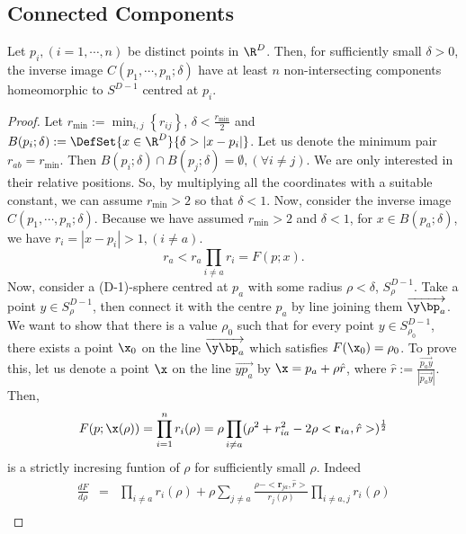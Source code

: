 \documentclass{article}
\begin{document}
\subsection{Connected Components}
\label{sec:org0113ac2}
\begin{prop}
Let $p_i, (i=1,\cdots,n)$ be distinct points in $\R^D$. Then, for sufficiently small $\delta >0$, the inverse image $C(p_1,\cdots,p_n;\delta)$ have at least $n$ non-intersecting components homeomorphic to $S^{D-1}$ centred at $p_i$.
\end{prop}
\begin{proof}
Let $r_{\min}:= \min_{i,j}\left\{r_{ij}\right\}$, $\delta < \frac{r_{\min}}{2}$ and $B(p_i;\delta):= \DefSet{x\in \R^D}{\delta >|x-p_i|}$. Let us denote the minimum pair $r_{ab}=r_{\min}$. Then $B(p_i;\delta)\cap B(p_j;\delta) = \emptyset, (\forall i\ne j)$.  We are only interested in their relative positions. So, by multiplying all the coordinates with a suitable constant, we can assume $r_{\min}>2$ so that $\delta <1$. Now, consider the inverse image $C(p_1,\cdots,p_n;\delta)$. Because we have assumed $r_{\min}>2$ and $\delta <1$, for $x\in B(p_a;\delta)$, we have $r_i = |x-p_i|>1, (i\ne a)$. 
\begin{equation}
\label{eq:inequality_radius}
r_a < r_a\prod_{i\ne a}r_i =F(p;x).
\end{equation}
Now, consider a (D-1)-sphere centred at $p_a$ with some radius $\rho < \delta$, $S^{D-1}_{\rho}$. Take a point $y \in S^{D-1}_{\rho}$, then connect it with the centre $p_a$ by line joining them $\overrightarrow{\y \bp_a}$. We want to show that there is a value $\rho_0$ such that for every point $y \in S^{D-1}_{\rho_0}$, there exists a point $\x_0$ on the line $\overrightarrow{\y \bp_a}$ which satisfies $F(\x_0)=\rho_0$. To prove this, let us denote a point $\x$ on the line $\overrightarrow{yp_a}$ by $\x = p_a + \rho \hat{r}$, where $\hat{r} := \frac{\overrightarrow{p_a y}}{|\overrightarrow{p_a y}|}$. Then, 
\begin{equation}
\label{}
F(p;\x(\rho))=\prod_{i=1}^{n} r_i(\rho) = \rho \prod_{i \ne a } (\rho^2 + r^2_{ia} - 2\rho <\mathbf{r}_{ia},\hat{r}>)^{\frac{1}{2}}
\end{equation}
is a strictly incresing funtion of $\rho$ for sufficiently small $\rho$. Indeed
\begin{eqnarray}
\label{}
\frac{d F}{d \rho} &=& \prod_{i \ne a } r_i(\rho) + \rho \sum_{j\ne a } \frac{\rho -  <\mathbf{r}_{ja},\hat{r}>}{r_j(\rho)}\prod_{i \ne a,j } r_i(\rho)\nonumber\\

\end{eqnarray}
\end{proof}
\end{document}
